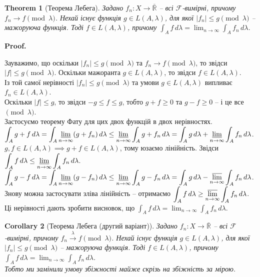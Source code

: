 \documentclass[a4paper, 10pt]{article}
\makeatletter
\theoremstyle{theoremdd}
\newtheorem{theorem}{Theorem}[subsection]
\newtheorem{corollary}[theorem]{Corollary}
\newcommand\tomeasure[1]{\overset{{#1}}{\to}}
\renewenvironment{proof}[1][Proof.\\]{\par
\pushQED{\hfill \qed}%
\normalfont \topsep6\p@\@plus6\p@\relax
\trivlist
\item\relax
{\bfseries
#1\@addpunct{.}}\hspace\labelsep\ignorespaces
}{%
\popQED\endtrivlist\@endpefalse
}
\makeatother
\begin{document}
\begin{theorem}[Теорема Лебега]
Задано $f_n \colon X \to \bar{\mathbb{R}}$ -- всі $\mathcal{F}$-вимірні, причому $f_n \to f \pmod \lambda$. Нехай існує функція $g \in L(A,\lambda)$, для якої $|f_n| \leq g \pmod \lambda$ -- мажоруюча функція. Тоді $f \in L(A,\lambda)$, причому $\displaystyle\int_A f\,d\lambda = \lim_{n \to \infty} \int_A f_n\,d\lambda$.
\end{theorem}

\begin{proof}
Зауважимо, що оскільки $|f_n| \leq g \pmod \lambda$ та $f_n \to f \pmod \lambda$, то звідси $|f| \leq g \pmod \lambda$. Оскільки мажоранта $g \in L(A,\lambda)$, то звідси $f \in L(A,\lambda)$.\\
Із той самої нерівності $|f_n| \leq g \pmod \lambda$ та умови $g \in L(A,\lambda)$ випливає $f_n \in L(A,\lambda)$.\\
Оскільки $|f| \leq g$, то звідси $-g \leq f \leq g$, тобто $g+f \geq 0$ та $g - f \geq 0$ -- і це все $\pmod \lambda$.\\
Застосуємо теорему Фату для цих двох функцій в двох нерівностях.\\
$\displaystyle \int_A g+f\,d\lambda = \int_A \varliminf_{n \to \infty} (g+f_n)\,d\lambda \leq \varliminf_{n \to \infty} \int_A g + f_n\,d\lambda \overset{}{=} \int_A g\,d\lambda + \varliminf_{n \to \infty} \int_A f_n\,d\lambda$.\\
$g,f \in L(A,\lambda) \implies g+f \in L(A,\lambda)$, тому юзаємо лінійність. Звідси $\displaystyle\int_A f\,d\lambda \leq \varliminf_{n \to \infty} \int_A f_n\,d\lambda$.\\
$\displaystyle\int_A g-f\,d\lambda = \int_A \varliminf_{n \to \infty} (g-f_n)\,d\lambda \leq \varliminf_{n \to \infty} \int_A g-f_n\,d\lambda = \int_A g\,d\lambda - \varlimsup_{n \to \infty} \int_A f_n\,d\lambda$.\\
Знову можна застосувати зліва лінійність -- отримаємо $\displaystyle\int_A f\,d\lambda \geq \varlimsup_{n \to \infty}\int_A f_n\,d\lambda$.\\
Ці нерівності дають зробити висновок, що $\displaystyle\int_A f\,d\lambda = \lim_{n \to \infty} \int_A f_n\,d\lambda$.
\end{proof}

\begin{corollary}[Теорема Лебега (другий варіант)]
Задано $f_n \colon X \to \bar{\mathbb{R}}$ -- всі $\mathcal{F}$-вимірні, причому $f_n \tomeasure{\lambda} f \pmod \lambda$. Нехай існує функція $g \in L(A,\lambda)$, для якої $|f_n| \leq g \pmod \lambda$ -- мажоруюча функція. Тоді $f \in L(A,\lambda)$, причому $\displaystyle\int_A f\,d\lambda = \lim_{n \to \infty} \int_A f_n\,d\lambda$.\\
\textit{Тобто ми замінили умову збіжності майже скрізь на збіжність за мірою.}
\end{corollary}
\end{document}
